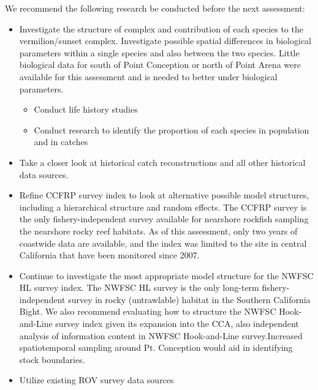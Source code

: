 \documentclass[
  english,
  a4paper,
]{article}
\providecommand{\tightlist}{%
  \setlength{\itemsep}{0pt}\setlength{\parskip}{0pt}}
\begin{document}
We recommend the following research be conducted before the next assessment:

\begin{itemize}
\item
  Investigate the structure of complex and contribution of each species to the
  vermilion/sunset complex. Investigate possible spatial differences in biological parameters within
  a single species and also between the two species. Little biological data for south of
  Point Conception or north of Point Arena were available for this assessment and is needed
  to better under biological parameters.

  \begin{itemize}
  \tightlist
  \item
    Conduct life history studies
  \item
    Conduct research to identify the proportion of each species in population and in catches
  \end{itemize}
\item
  Take a closer look at historical catch reconstructions and
  all other historical data sources.
\item
  Refine CCFRP survey index to look at alternative possible model structures, including
  a hierarchical structure and random effects. The CCFRP survey is the only
  fishery-independent survey available for nearshore rockfish sampling the nearshore rocky
  reef habitats. As of this assessment, only two years of coastwide data are available,
  and the index was limited to the site in central California that have been monitored
  since 2007.
\item
  Continue to investigate the most appropriate model structure for the NWFSC HL survey index.
  The NWFSC HL survey is the only long-term fishery-independent survey in rocky (untrawlable) habitat
  in the Southern California Bight. We also recommend evaluating how to structure the NWFSC Hook-and-Line survey index given its expansion into the CCA, also independent analysis of information content in NWFSC Hook-and-Line survey.Increased spatiotemporal sampling around Pt. Conception would aid in identifying stock boundaries.
\item
  Utilize existing ROV survey data sources


\end{itemize}
\end{document}
